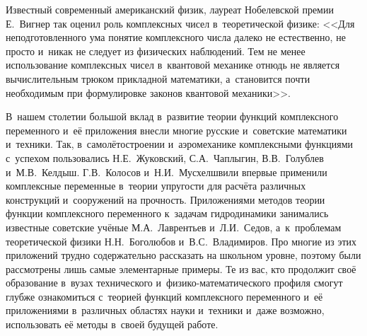 Известный современный американский физик, лауреат Нобелевской премии Е.~Вигнер
так оценил роль комплексных чисел в~теоретической физике:
<<Для неподготовленного ума понятие комплексного числа далеко не естественно,
не просто и~никак не следует из физических наблюдений. Тем не менее
использование комплексных чисел в~квантовой механике отнюдь не является
вычислительным трюком прикладной математики, а~становится почти необходимым
при формулировке законов квантовой механики>>.

В~нашем столетии большой вклад в~развитие теории функций комплексного
переменного и~её приложения внесли многие русские и~советские математики
и~техники. Так, в~самолётостроении и~аэромеханике комплексными функциями
с~успехом пользовались Н.Е.~Жуковский, С.А.~Чаплыгин, В.В.~Голублев
и~М.В.~Келдыш. Г.В.~Колосов и~Н.И.~Мусхелшвили впервые применили комплексные
переменные в~теории упругости для расчёта различных конструкций и~сооружений
на прочность. Приложениями методов теории функции комплексного переменного
к~задачам гидродинамики занимались известные советские учёные 
М.А.~Лаврентьев и~Л.И.~Седов, а~к~проблемам теоретической физики
Н.Н.~Боголюбов и~В.С.~Владимиров. Про многие из этих приложений трудно
содержательно рассказать на школьном уровне, поэтому были рассмотрены лишь
самые элементарные примеры. Те из вас, кто продолжит своё образование в~вузах
технического и~физико-математического профиля смогут глубже ознакомиться
с~теорией функций комплексного переменного и~её приложениями в~различных
областях науки и~техники и~даже возможно, использовать её методы в~своей
будущей работе.

